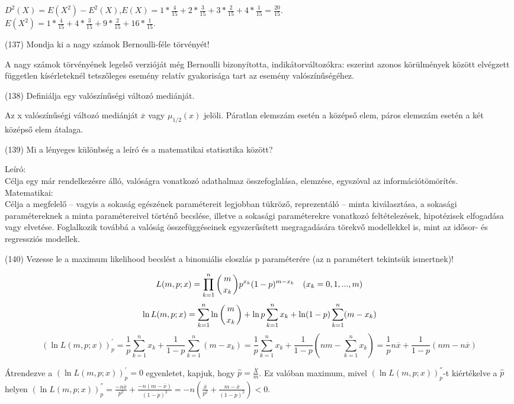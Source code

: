 \documentclass[12p]{article}
\begin{document}
$D^2(X) = E(X^2) - E^2(X)$,$E(X) = 1 * \frac{4}{15} + 2 * \frac{3}{15} + 3 * \frac{2}{15} + 4 * \frac{1}{15} = \frac{20}{15}$.\\
$E(X^2) = 1 * \frac{4}{15} + 4 * \frac{3}{15} + 9 * \frac{2}{15} + 16 * \frac{1}{15}$.

(137) Mondja ki a nagy számok Bernoulli-féle törvényét!

A nagy számok törvényének legelső verzióját
még Bernoulli bizonyította,
indikátorváltozókra: eszerint azonos
körülmények között elvégzett független
kísérleteknél tetszőleges esemény relatív
gyakorisága tart az esemény
valószínűségéhez.

(138) Definiálja egy valószínűségi változó mediánját.

Az x valószínűségi változó mediánját $\overline{x}$ vagy $\mu_{1/2}(x)$ jelöli.
Páratlan elemszám esetén a középső elem, páros elemszám esetén a két középső elem átalaga.

(139) Mi a lényeges különbség a leíró és a matematikai statisztika között?

Leíró:\\
Célja egy már rendelkezésre álló, valóságra vonatkozó adathalmaz összefoglalása, elemzése, egyszóval az információtömörítés.\\
Matematikai:\\
Célja a megfelelő – vagyis a sokaság egészének paramétereit legjobban tükröző, reprezentáló – minta kiválasztása, a sokasági paramétereknek a minta paramétereivel történő becslése, illetve a sokasági paraméterekre vonatkozó feltételezések, hipotézisek elfogadása vagy elvetése. Foglalkozik továbbá a valóság összefüggéseinek egyszerűsített megragadására törekvő modellekkel is, mint az idősor- és regressziós modellek.

(140) Vezesse le a maximum likelihood becslést a binomiális eloszlás p paraméterére (az n paramétert tekintsük ismertnek)!

$$L(m, p; x) = \prod_{k=1}^n \displaystyle{\left({m \atop x_k}\right)}p^{x_k}(1-p)^{m-x_k} \quad (x_k = 0, 1, ..., m)$$
$$\ln L(m, p; x) = \sum^n_{k=1} \ln \left ({m \atop x_k}\right) + \ln p \sum^n_{k=1} x_k + \ln(1-p) \sum^n_{k=1}(m-x_k)$$
$$(\ln L(m,p;x))^{'}_p = \frac{1}{p} \sum^n_{k=1}x_k + \frac{1}{1-p} \sum^n_{k=1} (m - x_k) = \frac{1}{p} \sum^n_{k=1}x_k + \frac{1}{1-p}
\left(nm- \sum^n_{k=1}x_k \right) = \frac{1}{p}n\overline{x} + \frac{1}{1-p}(nm-n\overline{x})$$

Átrendezve a $(\ln L(m,p;x))^{'}_p = 0$ egyenletet, kapjuk, hogy $\hat{p} = \frac{\overline{X}}{m}$.  Ez valóban maximum, mivel $(\ln L(m,p;x))^{''}_p$-t kiértékelve a $\hat{p}$ helyen $(\ln L(m,p;x))^{''}_p = \frac{-n \overline{x}}{p^2} + \frac{-n(m-\overline{x})}{(1-p)^2}=
-n\left(\frac{\overline{x}}{p^2}+\frac{m - \overline{x}}{(1-p)^2}\right)<0$.
\end{document}
